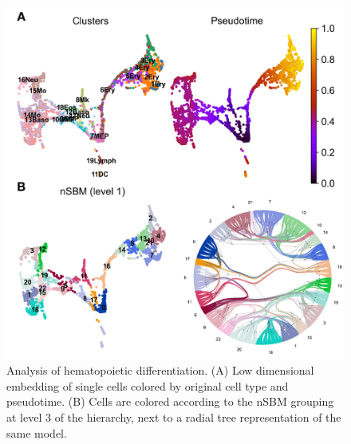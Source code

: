 \documentclass[11pt, titlepage, twoside]{article}
\begin{document}
\begin{figure}[htbp]
\centering
\includegraphics[keepaspectratio,width=\textwidth,height=0.75\textheight]{Figure_Hemato_Supp.png}
\caption[]{Analysis of hematopoietic differentiation. (A) Low dimensional embedding of single cells colored by original cell type and pseudotime. (B) Cells are colored according to the nSBM grouping at level 3 of the hierarchy, next to a radial tree representation of the same model.}\label{Figure_Hemato_Supp}
\end{figure}
\end{document}
